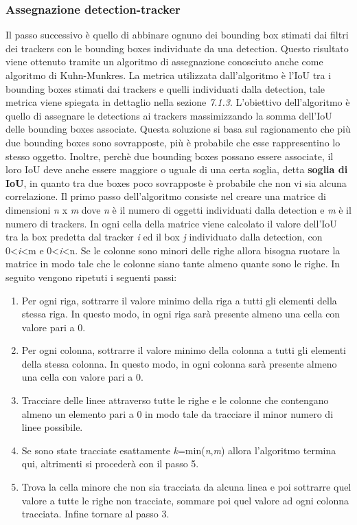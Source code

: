 \subsubsection{Assegnazione detection-tracker}
Il passo successivo è quello di abbinare ognuno dei bounding box stimati dai filtri dei trackers con le bounding boxes individuate da una detection.
Questo risultato viene ottenuto tramite un algoritmo di assegnazione conosciuto anche come algoritmo di Kuhn-Munkres. La metrica utilizzata dall'algoritmo è l'IoU tra i bounding boxes stimati dai trackers e quelli individuati dalla detection, tale metrica viene spiegata in dettaglio nella sezione \textit{7.1.3}. L'obiettivo dell'algoritmo è quello di assegnare le detections ai trackers massimizzando la somma dell'IoU delle bounding boxes associate. Questa soluzione si basa sul ragionamento che più due bounding boxes sono sovrapposte, più è probabile che esse rappresentino lo stesso oggetto. Inoltre, perchè due bounding boxes possano essere associate, il loro IoU deve anche essere maggiore o uguale di una certa soglia, detta \textbf{soglia di IoU}, in quanto tra due boxes poco sovrapposte è probabile che non vi sia alcuna correlazione.
Il primo passo dell'algoritmo consiste nel creare una matrice di dimensioni \textit{n} x \textit{m} dove \textit{n} è il numero di oggetti individuati dalla detection e \textit{m} è il numero di trackers. In ogni cella della matrice viene calcolato il valore dell'IoU tra la box predetta dal tracker \textit{i} ed il box \textit{j} individuato dalla detection, con 0\textless\textit{i}\textless m e 0\textless\textit{i}\textless n.
Se le colonne sono minori delle righe allora bisogna ruotare la matrice in modo tale che le colonne siano tante almeno quante sono le righe.
In seguito vengono ripetuti i seguenti passi:
\begin{enumerate}
\item Per ogni riga, sottrarre il valore minimo della riga a tutti gli elementi della stessa riga. In questo modo, in ogni riga sarà presente almeno una cella con valore pari a 0.
\item Per ogni colonna, sottrarre il valore minimo della colonna a tutti gli elementi della stessa colonna. In questo modo, in ogni colonna sarà presente almeno una cella con valore pari a 0.
\item Tracciare delle linee attraverso tutte le righe e le colonne che contengano almeno un elemento pari a 0 in modo tale da tracciare il minor numero di linee possibile.
\item Se sono state tracciate esattamente \textit{k}=min(\textit{n},\textit{m}) allora l'algoritmo termina qui, altrimenti si procederà con il passo 5.
\item Trova la cella minore che non sia tracciata da alcuna linea e poi sottrarre quel valore a tutte le righe non tracciate, sommare poi quel valore ad ogni colonna tracciata. Infine tornare al passo 3.
\end{enumerate} 
